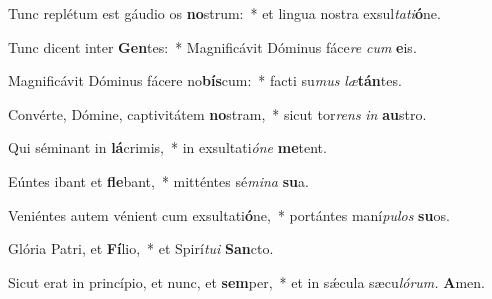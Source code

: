 \item Tunc replétum est gáudio os \textbf{no}strum:~* et lingua nostra exsul\textit{tati}\textbf{ó}ne.
\item Tunc dicent inter \textbf{Gen}tes:~* Magnificávit Dóminus fáce\textit{re} \textit{cum} \textbf{e}is.
\item Magnificávit Dóminus fácere no\textbf{bís}cum:~* facti su\textit{mus} \textit{læ}\textbf{tán}tes.
\item Convérte, Dómine, captivitátem \textbf{no}stram,~* sicut tor\textit{rens} \textit{in} \textbf{au}stro.
\item Qui séminant in \textbf{lá}crimis,~* in exsultati\textit{óne} \textbf{me}tent.
\item Eúntes ibant et \textbf{fle}bant,~* mitténtes sé\textit{mina} \textbf{su}a.
\item Veniéntes autem vénient cum exsultati\textbf{ó}ne,~* portántes maní\textit{pulos} \textbf{su}os.
\item Glória Patri, et \textbf{Fí}lio,~* et Spirí\textit{tui} \textbf{San}cto.
\item Sicut erat in princípio, et nunc, et \textbf{sem}per,~* et in sǽcula sæcu\hspace{0.03em}\textit{lórum.} \textbf{A}men.